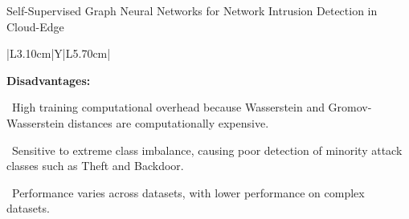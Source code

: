 \begin{frame}[t]{Self-Supervised Graph Neural Networks for Network Intrusion Detection in Cloud-Edge}
{\begin{tabularx}{\textwidth}{|L{3.10cm}|Y|L{5.70cm}|}
\begin{minipage}[t]{\linewidth}
\textcolor{limitRed}{\textbf{Disadvantages:}}\par\vspace{1.3pt}
\textbullet~High training computational overhead because Wasserstein and Gromov-Wasserstein distances are computationally expensive.\par\vspace{1.8pt}\textbullet~Sensitive to extreme class imbalance, causing poor detection of minority attack classes such as Theft and Backdoor.\par\vspace{1.8pt}\textbullet~Performance varies across datasets, with lower performance on complex datasets.\par\vspace{3pt}
\end{minipage} \\\hline
\end{tabularx}}
\end{frame}

